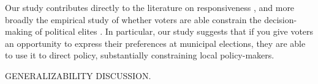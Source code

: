\documentclass[a4paper,12pt]{article}
\begin{document}

Our study contributes directly to the literature on responsiveness \citep{tausanovitch2014representation}, and more broadly the empirical study of whether voters are able constrain the decision-making of political elites \citep{berry2009imperfect}. In particular, our study suggests that if you give voters an opportunity to express their preferences at municipal elections, they are able to use it to direct policy, substantially constraining local policy-makers.

GENERALIZABILITY DISCUSSION.




\onehalfspacing



\clearpage

\renewcommand{\thesubsection}{\Alph{subsection}}
\renewcommand{\thetable}{\Alph{subsection}\arabic{table}}
\renewcommand{\thefigure}{\Alph{subsection}\arabic{figure}}
\end{document}

